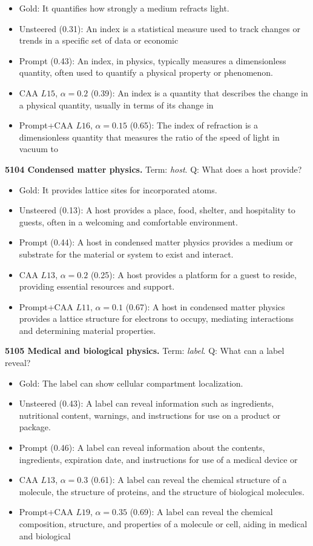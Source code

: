 \begin{itemize}\setlength{\itemsep}{0.15em}\setlength{\parsep}{0pt}\setlength{\topsep}{0.2em}
\item Gold: It quantifies how strongly a medium refracts light.
\item Unsteered (0.31): An index is a statistical measure used to track changes or trends in a specific set of data or economic
\item Prompt (0.43): An index, in physics, typically measures a dimensionless quantity, often used to quantify a physical property or phenomenon.
\item CAA $L15$, $\alpha=0.2$ (0.39): An index is a quantity that describes the change in a physical quantity, usually in terms of its change in
\item Prompt+CAA $L16$, $\alpha=0.15$ (0.65): The index of refraction is a dimensionless quantity that measures the ratio of the speed of light in vacuum to
\end{itemize}
\medskip\noindent\textbf{5104 Condensed matter physics.} Term: \emph{host}.
Q: What does a host provide?
\begin{itemize}\setlength{\itemsep}{0.15em}\setlength{\parsep}{0pt}\setlength{\topsep}{0.2em}
\item Gold: It provides lattice sites for incorporated atoms.
\item Unsteered (0.13): A host provides a place, food, shelter, and hospitality to guests, often in a welcoming and comfortable environment.
\item Prompt (0.44): A host in condensed matter physics provides a medium or substrate for the material or system to exist and interact.
\item CAA $L13$, $\alpha=0.2$ (0.25): A host provides a platform for a guest to reside, providing essential resources and support.
\item Prompt+CAA $L11$, $\alpha=0.1$ (0.67): A host in condensed matter physics provides a lattice structure for electrons to occupy, mediating interactions and determining material properties.
\end{itemize}
\medskip\noindent\textbf{5105 Medical and biological physics.} Term: \emph{label}.
Q: What can a label reveal?
\begin{itemize}\setlength{\itemsep}{0.15em}\setlength{\parsep}{0pt}\setlength{\topsep}{0.2em}
\item Gold: The label can show cellular compartment localization.
\item Unsteered (0.43): A label can reveal information such as ingredients, nutritional content, warnings, and instructions for use on a product or package.
\item Prompt (0.46): A label can reveal information about the contents, ingredients, expiration date, and instructions for use of a medical device or
\item CAA $L13$, $\alpha=0.3$ (0.61): A label can reveal the chemical structure of a molecule, the structure of proteins, and the structure of biological molecules.
\item Prompt+CAA $L19$, $\alpha=0.35$ (0.69): A label can reveal the chemical composition, structure, and properties of a molecule or cell, aiding in medical and biological
\end{itemize}
